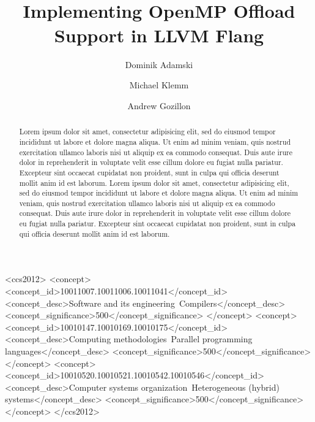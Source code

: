 \documentclass[acmtog,natbib=false]{acmart}
\newcommand{\registered}[0]{\textsuperscript{\textregistered}\xspace}
\begin{document}
\title{Implementing OpenMP\registered Offload Support in LLVM Flang}

\author{Dominik Adamski}
\orcid{}

\author{Michael Klemm}

\author{Andrew Gozillon}

\renewcommand{\shortauthors}{Adamski et al.}

\begin{abstract}
Lorem ipsum dolor sit amet, consectetur adipisicing elit, sed do eiusmod
tempor incididunt ut labore et dolore magna aliqua. Ut enim ad minim veniam,
quis nostrud exercitation ullamco laboris nisi ut aliquip ex ea commodo
consequat. Duis aute irure dolor in reprehenderit in voluptate velit esse
cillum dolore eu fugiat nulla pariatur. Excepteur sint occaecat cupidatat non
proident, sunt in culpa qui officia deserunt mollit anim id est laborum.
Lorem ipsum dolor sit amet, consectetur adipisicing elit, sed do eiusmod
tempor incididunt ut labore et dolore magna aliqua. Ut enim ad minim veniam,
quis nostrud exercitation ullamco laboris nisi ut aliquip ex ea commodo
consequat. Duis aute irure dolor in reprehenderit in voluptate velit esse
cillum dolore eu fugiat nulla pariatur. Excepteur sint occaecat cupidatat non
proident, sunt in culpa qui officia deserunt mollit anim id est laborum.
\end{abstract}

\begin{CCSXML}
<ccs2012>
   <concept>
       <concept_id>10011007.10011006.10011041</concept_id>
       <concept_desc>Software and its engineering~Compilers</concept_desc>
       <concept_significance>500</concept_significance>
       </concept>
   <concept>
       <concept_id>10010147.10010169.10010175</concept_id>
       <concept_desc>Computing methodologies~Parallel programming languages</concept_desc>
       <concept_significance>500</concept_significance>
       </concept>
   <concept>
       <concept_id>10010520.10010521.10010542.10010546</concept_id>
       <concept_desc>Computer systems organization~Heterogeneous (hybrid) systems</concept_desc>
       <concept_significance>500</concept_significance>
       </concept>
 </ccs2012>
\end{CCSXML}
\end{document}
